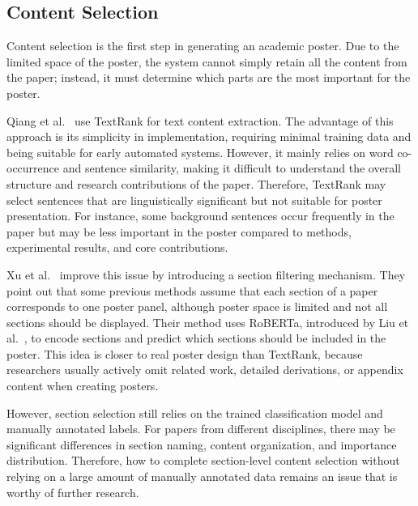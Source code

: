 \documentclass[12pt,oneside]{report}
\begin{document}
\subsection{Content Selection}

Content selection is the first step in generating an academic poster. Due to the limited space of the poster, the system cannot simply retain all the content from the paper; instead, it must determine which parts are the most important for the poster.

\vspace{1em}

Qiang et al.~\cite{poster2016} use TextRank for text content extraction. The advantage of this approach is its simplicity in implementation, requiring minimal training data and being suitable for early automated systems. However, it mainly relies on word co-occurrence and sentence similarity, making it difficult to understand the overall structure and research contributions of the paper. Therefore, TextRank may select sentences that are linguistically significant but not suitable for poster presentation. For instance, some background sentences occur frequently in the paper but may be less important in the poster compared to methods, experimental results, and core contributions.

Xu et al.~\cite{posterbot} improve this issue by introducing a section filtering mechanism. They point out that some previous methods assume that each section of a paper corresponds to one poster panel, although poster space is limited and not all sections should be displayed. Their method uses RoBERTa, introduced by Liu et al.~\cite{roberta}, to encode sections and predict which sections should be included in the poster. This idea is closer to real poster design than TextRank, because researchers usually actively omit related work, detailed derivations, or appendix content when creating posters.

\vspace{1em}

However, section selection still relies on the trained classification model and manually annotated labels. For papers from different disciplines, there may be significant differences in section naming, content organization, and importance distribution. Therefore, how to complete section-level content selection without relying on a large amount of manually annotated data remains an issue that is worthy of further research.

\vspace{1em}
\end{document}
